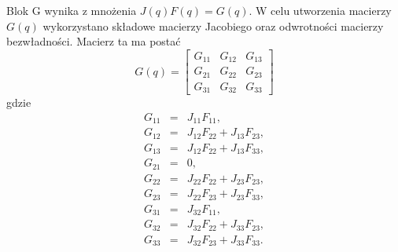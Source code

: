 \documentclass[eng,printmode]{mgr}
\begin{document}
Blok G wynika z mnożenia $J(q)F(q)=G(q)$. W celu utworzenia macierzy $G(q)$ wykorzystano składowe macierzy Jacobiego oraz odwrotności macierzy bezwładności. Macierz ta ma postać
$$
G(q)=\left[
      \begin{array}{ccc}
         G_{11} & G_{12} & G_{13}\\ 
         G_{21} &G_{22} & G_{23}\\
         G_{31} & G_{32} & G_{33}
         \end{array}
      \right]
      $$
gdzie
\begin{eqnarray}
G_{11}&=&J_{11}F_{11},\\ \nonumber
G_{12}&=&J_{12}F_{22}+J_{13}F_{23},\\ \nonumber
G_{13}&=&J_{12}F_{22}+J_{13}F_{33},\\ \nonumber
G_{21}&=&0,\\ \nonumber
G_{22}&=&J_{22}F_{22}+J_{23}F_{23},\\ \nonumber
G_{23}&=&J_{22}F_{23}+J_{23}F_{33},\\ \nonumber
G_{31}&=&J_{32}F_{11},\\ \nonumber
G_{32}&=&J_{32}F_{22}+J_{33}F_{23},\\ \nonumber
G_{33}&=&J_{32}F_{23}+J_{33}F_{33}.
\end{eqnarray}
\end{document}
